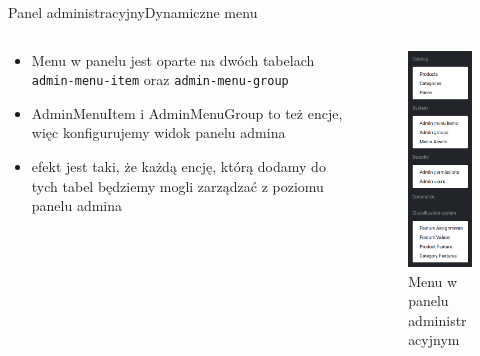\documentclass[polish,xcolor=table,9pt,aspectratio=1610,hyperref={pdfpagemode=FullScreen}]{beamer}
\begin{document}
\begin{frame}{Panel administracyjny}{Dynamiczne menu}
\begin{columns}
	\begin{column}{0.5\textwidth}
		\begin{itemize}
			\item<1-> Menu w panelu jest oparte na dwóch tabelach \texttt{admin-menu-item} oraz \texttt{admin-menu-group}
			\item<1-> AdminMenuItem i AdminMenuGroup to też encje, więc konfigurujemy widok panelu admina
			\item<1-> efekt jest taki, że każdą encję, którą dodamy do tych tabel będziemy mogli zarządzać z poziomu panelu admina
		\end{itemize}
	\end{column}
	\begin{column}{0.5\textwidth}
			\begin{figure}
				\begin{center}
					\includegraphics[scale=0.2]{menu.png}
				\end{center}
				\caption{{\color{black}Menu w panelu administracyjnym}} 
			\end{figure}
	\end{column}
\end{columns}
\end{frame}
\end{document}
